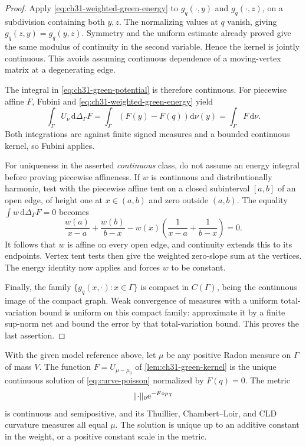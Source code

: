 \begin{proof}
Apply \eqref{eq:ch31-weighted-green-energy} to
\(g_q(\cdot,y)\) and \(g_q(\cdot,z)\), on a subdivision containing
both \(y,z\).  The normalizing values at \(q\) vanish, giving
\(g_q(z,y)=g_q(y,z)\).  Symmetry and the uniform estimate already
proved give the same modulus of continuity in the second variable.
Hence the kernel is jointly continuous.  This avoids assuming
continuous dependence of a moving-vertex matrix at a degenerating edge.

The integral in \eqref{eq:ch31-green-potential} is therefore
continuous.  For piecewise affine \(F\), Fubini and
\eqref{eq:ch31-weighted-green-energy} yield
\[
 \int_\Gamma U_\nu\,\mathrm d\Delta_\Gamma F
  =\int_\Gamma\left(F(y)-F(q)\right)\mathrm d\nu(y)
  =\int_\Gamma F\,\mathrm d\nu.
\]
Both integrations are against finite signed measures and a bounded
continuous kernel, so Fubini applies.

For uniqueness in the asserted \emph{continuous} class, do not assume
an energy integral before proving piecewise affineness.  If \(w\) is
continuous and distributionally harmonic, test with the piecewise
affine tent on a closed subinterval \([a,b]\) of an open edge, of
height one at \(x\in(a,b)\) and zero outside \((a,b)\).
The equality \(\int w\,\mathrm d\Delta_\Gamma F=0\) becomes
\[
 \frac{w(a)}{x-a}+\frac{w(b)}{b-x}
       -w(x)\left(\frac1{x-a}+\frac1{b-x}\right)=0.
\]
It follows that \(w\) is affine on every open edge, and continuity
extends this to its endpoints.  Vertex tent tests then give the
weighted zero-slope sum at the vertices.  The energy identity now
applies and forces \(w\) to be constant.

Finally, the family \(\{g_q(x,\cdot):x\in \Gamma\}\) is compact in
\(C(\Gamma)\), being the continuous image of the compact graph.  Weak
convergence of measures with a uniform total-variation bound is uniform
on this compact family: approximate it by a finite sup-norm net and
bound the error by that total-variation bound.  This proves the last
assertion.
\end{proof}



\begin{proposition}
\label{prop:graph-ma-solution}
With the given model reference above, let \(\mu\) be any positive Radon
measure on \(\Gamma\) of mass \(V\).  The function
\(F=U_{\mu-\mu_0}\) of \cref{lem:ch31-green-kernel} is the unique
continuous solution of \eqref{eq:curve-poisson} normalized by \(F(q)=0\).
The metric
\[
             \lVert\cdot\rVert_0\mathrm e^{-F\circ p_{\mathfrak X}}
\]
is continuous and semipositive, and its Thuillier, Chambert--Loir,
and CLD curvature measures all equal \(\mu\).
The solution is unique up to an additive constant in the weight,
or a positive constant scale in the metric.
\end{proposition}

